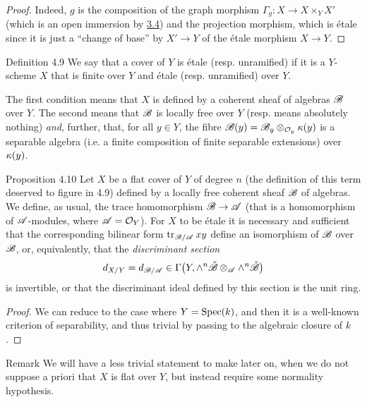 \begin{proof}
  Indeed, $g$ is the composition of the graph morphism $\Gamma_g\colon X\to X\times_Y X'$ (which is an open immersion by \hyperref[I.3.4]{3.4}) and the projection morphism, which is \'{e}tale since it is just a ``change of base'' by $X'\to Y$ of the \'{e}tale morphism $X\to Y$.
\end{proof}

\begin{rmenv}{Definition 4.9}
\label{I.4.9}
  We say that a cover of $Y$ is \'{e}tale (resp. unramified) if it is a $Y$-scheme $X$ that is finite over $Y$ and \'{e}tale (resp. unramified) over $Y$.
\end{rmenv}

The first condition means that $X$ is defined by a coherent sheaf of algebras ${\mathscr{B}}$ over $Y$.
The second means that ${\mathscr{B}}$ is locally free over $Y$ (resp. means absolutely nothing) \emph{and}, further, that, for all $y\in Y$, the fibre ${\mathscr{B}}(y)={\mathscr{B}}_y\otimes_{{\mathcal{O}}_y}\kappa(y)$ is a separable algebra (i.e. a finite composition of finite separable extensions) over $\kappa(y)$.

\begin{itenv}{Proposition 4.10}
\label{4.10}
  Let $X$ be a flat cover of $Y$ of degree $n$ (the definition of this term deserved to figure in 4.9) defined by a locally free coherent sheaf ${\mathscr{B}}$ of algebras.
  We define, as usual, the trace homomorphism ${\mathscr{B}}\to{\mathscr{A}}$ (that is a homomorphism of ${\mathscr{A}}$-modules, where ${\mathscr{A}}={\mathcal{O}}_Y$).
  For $X$ to be \'{e}tale it is necessary and sufficient that the corresponding bilinear form $\operatorname{tr}_{{\mathscr{B}}/{\mathscr{A}}}xy$ define an isomorphism of ${\mathscr{B}}$ over ${\mathscr{B}}$, or, equivalently, that the \emph{discriminant section}
  \[
    d_{X/Y}
    = d_{{\mathscr{B}}/{\mathscr{A}}}
    \in \Gamma\big(Y,\wedge^n\check{{\mathscr{B}}}\otimes_{\mathscr{A}}\wedge^n\check{{\mathscr{B}}}\big)
  \]
  is invertible, or that the discriminant ideal defined by this section is the unit ring.
\end{itenv}

\begin{proof}
  We can reduce to the case where $Y=\operatorname{Spec}(k)$, and then it is a well-known criterion of separability, and thus trivial by passing to the algebraic closure of $k$.
\end{proof}

\begin{rmenv}{Remark}
  We will have a less trivial statement to make later on,
  when we do not suppose a priori that $X$ is flat over $Y$, but instead require some normality hypothesis.
\end{rmenv}